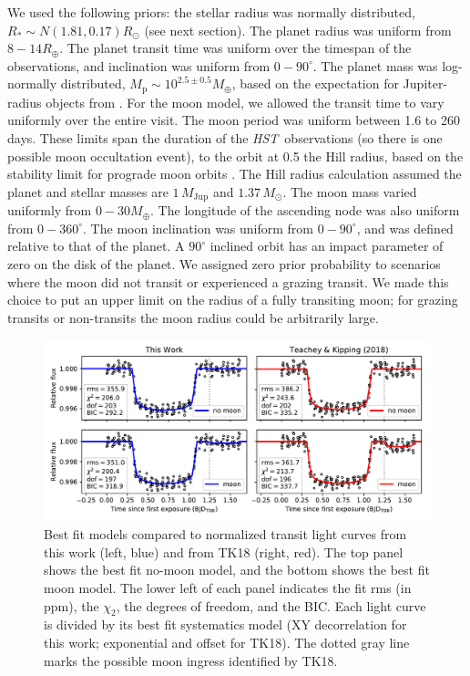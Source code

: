 \documentclass[twocolumn,trackchanges]{aastex62}
\newcommand{\project}[1]{\textsl{#1}}
\newcommand{\HST}{\project{HST}}
\begin{document}
We used the following priors: the stellar radius was normally distributed, $R_* \sim N(1.81, 0.17) R_\odot$ (see next section). The planet radius was uniform from $8 - 14R_\oplus$. The planet transit time was uniform over the timespan of the observations, and inclination was uniform from $0 - 90^\circ$.  The planet mass was log-normally distributed, $M_\mathrm{p} \sim 10^{2.5 \pm 0.5} M_\oplus$, based on the expectation for Jupiter-radius objects from \cite{ning18}.  For the moon model, we allowed the transit time to vary uniformly over the entire visit. The moon period was uniform between 1.6 to 260 days. These limits span the duration of the \HST\ observations (so there is one possible moon occultation event), to the orbit at 0.5 the Hill radius, based on the stability limit for prograde moon orbits \citep{domingos06}. The Hill radius calculation assumed the planet and stellar masses are $1\,M_\mathrm{Jup}$ and $1.37\,M_\odot$.  The moon mass varied uniformly from $0 - 30 M_\oplus$. The longitude of the ascending node was also uniform from $0 - 360^\circ$.  The moon inclination was uniform from $0 - 90^\circ$,  and was defined relative to that of the planet. A $90^\circ$ inclined orbit has an impact parameter of zero on the disk of the planet. We assigned zero prior probability to scenarios where the moon did not transit or experienced a grazing transit. We made this choice to put an upper limit on the radius of a fully transiting moon; for grazing transits or non-transits the moon radius could be arbitrarily large.




\begin{figure}
\includegraphics[width = 1.0 \textwidth]{fig3_bestfits.pdf}
    \caption{Best fit models compared to normalized transit light curves from this work (left, blue) and from TK18 (right, red). The top panel shows the best fit no-moon model, and the bottom shows the best fit moon model. The lower left of each panel indicates the fit rms (in ppm), the $\chi_2$, the degrees of freedom, and the BIC.  Each light curve is divided by its best fit systematics model (XY decorrelation for this work; exponential and offset for TK18).  The dotted gray line marks the possible moon ingress identified by TK18.}
\label{fig:bestfit}
\end{figure}
\end{document}
